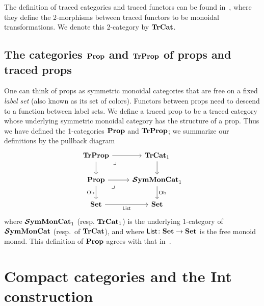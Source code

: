 \documentclass[12pt,oneside,article,draft]{memoir}
\begin{document}
The definition of traced categories and traced functors can be found in~\cite{JoyalStreetVerity}, where they define the 2-morphisms between traced functors to be monoidal transformations. We denote this 2-category by $\mathbf{TrCat}$.

\subsection{The categories $\mathbf{Prop}$ and $\mathbf{TrProp}$ of props and traced props}\label{sec:defining props}

One can think of props as symmetric monoidal categories that are free on a fixed \emph{label set} (also known as its set of colors). Functors between props need to descend to a function between label sets. We define a traced prop to be a traced category whose underlying symmetric monoidal category has the structure of a prop. Thus we have defined the 1-categories $\mathbf{Prop}$ and $\mathbf{TrProp}$; we summarize our definitions by the pullback diagram
\[
\begin{tikzcd}
	\TrProp\ar[r]\ar[d]\arrow[dr, phantom, "\lrcorner", very near start]&\TrCat_1\ar[d]\\
	\Prop\ar[r]\ar[d,"\Ob"']\arrow[dr, phantom, "\lrcorner", very near start]&\SSymMonCat_1\ar[d,"\Ob"]\\
	\Set\ar[r,"\Fun{List}"']&\Set
\end{tikzcd}
\]
where $\bm{\mathcal{S}}\mathbf{ymMonCat}_1$ (resp. $\mathbf{TrCat}_1$) is the underlying 1-category of $\bm{\mathcal{S}}\mathbf{ymMonCat}$ (resp.\ of $\mathbf{TrCat}$), and where $\mathsf{List}\colon\mathbf{Set}\to\mathbf{Set}$ is the free monoid monad. This definition of $\mathbf{Prop}$ agrees with that in~\cite{HackneyRobertson}.


\section{Compact categories and the Int construction}\label{sec:compact and int}
\end{document}
